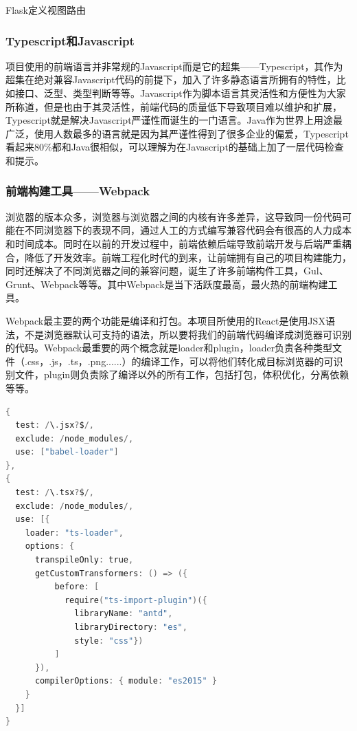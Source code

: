 \begin{center}
	{\small Flask定义视图路由}
\end{center}

\subsubsection{Typescript和Javascript}

项目使用的前端语言并非常规的Javascript而是它的超集——Typescript，其作为超集在绝对兼容Javascript代码的前提下，加入了许多静态语言所拥有的特性，比如接口、泛型、类型判断等等。Javascript作为脚本语言其灵活性和方便性为大家所称道，但是也由于其灵活性，前端代码的质量低下导致项目难以维护和扩展，Typescript就是解决Javascript严谨性而诞生的一门语言。Java作为世界上用途最广泛，使用人数最多的语言就是因为其严谨性得到了很多企业的偏爱，Typescript看起来80\%都和Java很相似，可以理解为在Javascript的基础上加了一层代码检查和提示。

\subsubsection{前端构建工具——Webpack}

浏览器的版本众多，浏览器与浏览器之间的内核有许多差异，这导致同一份代码可能在不同浏览器下的表现不同，通过人工的方式编写兼容代码会有很高的人力成本和时间成本。同时在以前的开发过程中，前端依赖后端导致前端开发与后端严重耦合，降低了开发效率。前端工程化时代的到来，让前端拥有自己的项目构建能力，同时还解决了不同浏览器之间的兼容问题，诞生了许多前端构件工具，Gul、Grunt、Webpack等等。其中Webpack是当下活跃度最高，最火热的前端构建工具。

Webpack最主要的两个功能是编译和打包。本项目所使用的React是使用JSX语法，不是浏览器默认可支持的语法，所以要将我们的前端代码编译成浏览器可识别的代码。Webpack最重要的两个概念就是loader和plugin，loader负责各种类型文件（.css，.js，.ts，.png......）的编译工作，可以将他们转化成目标浏览器的可识别文件，plugin则负责除了编译以外的所有工作，包括打包，体积优化，分离依赖等等。

\begin{lstlisting}[language=C]
{
  test: /\.jsx?$/,
  exclude: /node_modules/,
  use: ["babel-loader"]
},
{
  test: /\.tsx?$/,
  exclude: /node_modules/,
  use: [{
    loader: "ts-loader",
    options: {
      transpileOnly: true,
      getCustomTransformers: () => ({
          before: [
            require("ts-import-plugin")({
              libraryName: "antd",
              libraryDirectory: "es",
              style: "css"})
          ]
      }),
      compilerOptions: { module: "es2015" }
    }
  }]
}
\end{lstlisting}

